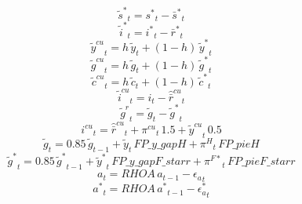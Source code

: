 \begin{dmath}
{{\tilde s^*}}_{t}={{s^*}}_{t}-{{\bar s^*}}_{t}
\end{dmath}
\begin{dmath}
{{\tilde i^*}}_{t}={{i^*}}_{t}-{{\bar r^*}}_{t}
\end{dmath}
\begin{dmath}
{{\tilde y^{cu}}}_{t}={{h}}\, {{\tilde y}}_{t}+\left(1-{{h}}\right)\, {{\tilde y^*}}_{t}
\end{dmath}
\begin{dmath}
{{\tilde g^{cu}}}_{t}={{h}}\, {{\tilde g}}_{t}+\left(1-{{h}}\right)\, {{\tilde g^*}}_{t}
\end{dmath}
\begin{dmath}
{{\tilde c^{cu}}}_{t}={{h}}\, {{\tilde c}}_{t}+\left(1-{{h}}\right)\, {{\tilde c^*}}_{t}
\end{dmath}
\begin{dmath}
{{\tilde i^{cu}}}_{t}={{i}}_{t}-{{\hat {\bar r}^{cu}}}_{t}
\end{dmath}
\begin{dmath}
{{\tilde g^{r}}}_{t}={{\tilde g}}_{t}-{{\tilde g^*}}_{t}
\end{dmath}
\begin{dmath}
{{i^{cu}}}_{t}={{\hat {\bar r}^{cu}}}_{t}+{{\pi^{cu}}}_{t}\, 1.5+{{\tilde y^{cu}}}_{t}\, 0.5
\end{dmath}
\begin{dmath}
{{\tilde g}}_{t}=0.85\, {{\tilde g}}_{t-1}+{{\tilde y}}_{t}\, {FP\_y\_gapH}+{{\pi^H}}_{t}\, {FP\_pieH}
\end{dmath}
\begin{dmath}
{{\tilde g^*}}_{t}=0.85\, {{\tilde g^*}}_{t-1}+{{\tilde y^*}}_{t}\, {FP\_y\_gapF\_starr}+{{\pi^{F*}}}_{t}\, {FP\_pieF\_starr}
\end{dmath}
\begin{dmath}
{{a}}_{t}={RHOA}\, {{a}}_{t-1}-{{\epsilon_a}}_{t}
\end{dmath}
\begin{dmath}
{{a^*}}_{t}={RHOA}\, {{a^*}}_{t-1}-{{\epsilon_a^*}}_{t}
\end{dmath}

